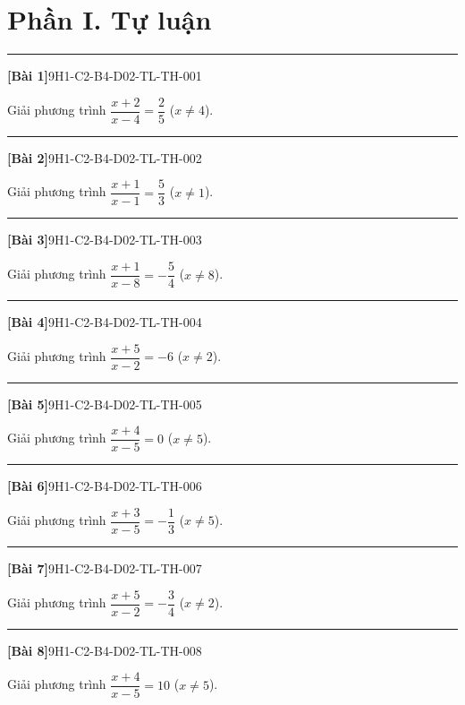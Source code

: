 \documentclass[12pt,a4paper]{article}
\newif\ifloigiai
\newenvironment{cauhoi}[2]{%
  \par\medskip\noindent\rule{\textwidth}{0.4pt}\par\nopagebreak
  \noindent\textbf{[#1]}\hfill{\scriptsize\ttfamily #2}\par\nopagebreak\smallskip}{\par}
\newcommand{\loigiai}[1]{\ifloigiai\par\smallskip\noindent\textit{Lời giải.} #1\par\fi}
\begin{document}
\section*{Phần I. Tự luận}
\begin{cauhoi}{Bài 1}{9H1-C2-B4-D02-TL-TH-001}
Giải phương trình $\dfrac{x+2}{x-4}=\dfrac{2}{5}$ ($x\ne 4$).
\loigiai{Điều kiện $x\ne 4$. Nhân hai vế với $x-4$: $x+2=\dfrac{2}{5}(x-4)$. Giải ta được $x=-6$ (thoả điều kiện).}
\end{cauhoi}
\begin{cauhoi}{Bài 2}{9H1-C2-B4-D02-TL-TH-002}
Giải phương trình $\dfrac{x+1}{x-1}=\dfrac{5}{3}$ ($x\ne 1$).
\loigiai{Điều kiện $x\ne 1$. Nhân hai vế với $x-1$: $x+1=\dfrac{5}{3}(x-1)$. Giải ta được $x=4$ (thoả điều kiện).}
\end{cauhoi}
\begin{cauhoi}{Bài 3}{9H1-C2-B4-D02-TL-TH-003}
Giải phương trình $\dfrac{x+1}{x-8}=-\dfrac{5}{4}$ ($x\ne 8$).
\loigiai{Điều kiện $x\ne 8$. Nhân hai vế với $x-8$: $x+1=-\dfrac{5}{4}(x-8)$. Giải ta được $x=4$ (thoả điều kiện).}
\end{cauhoi}
\begin{cauhoi}{Bài 4}{9H1-C2-B4-D02-TL-TH-004}
Giải phương trình $\dfrac{x+5}{x-2}=-6$ ($x\ne 2$).
\loigiai{Điều kiện $x\ne 2$. Nhân hai vế với $x-2$: $x+5=-6(x-2)$. Giải ta được $x=1$ (thoả điều kiện).}
\end{cauhoi}
\begin{cauhoi}{Bài 5}{9H1-C2-B4-D02-TL-TH-005}
Giải phương trình $\dfrac{x+4}{x-5}=0$ ($x\ne 5$).
\loigiai{Điều kiện $x\ne 5$. Nhân hai vế với $x-5$: $x+4=0(x-5)$. Giải ta được $x=-4$ (thoả điều kiện).}
\end{cauhoi}
\begin{cauhoi}{Bài 6}{9H1-C2-B4-D02-TL-TH-006}
Giải phương trình $\dfrac{x+3}{x-5}=-\dfrac{1}{3}$ ($x\ne 5$).
\loigiai{Điều kiện $x\ne 5$. Nhân hai vế với $x-5$: $x+3=-\dfrac{1}{3}(x-5)$. Giải ta được $x=-1$ (thoả điều kiện).}
\end{cauhoi}
\begin{cauhoi}{Bài 7}{9H1-C2-B4-D02-TL-TH-007}
Giải phương trình $\dfrac{x+5}{x-2}=-\dfrac{3}{4}$ ($x\ne 2$).
\loigiai{Điều kiện $x\ne 2$. Nhân hai vế với $x-2$: $x+5=-\dfrac{3}{4}(x-2)$. Giải ta được $x=-2$ (thoả điều kiện).}
\end{cauhoi}
\begin{cauhoi}{Bài 8}{9H1-C2-B4-D02-TL-TH-008}
Giải phương trình $\dfrac{x+4}{x-5}=10$ ($x\ne 5$).
\loigiai{Điều kiện $x\ne 5$. Nhân hai vế với $x-5$: $x+4=10(x-5)$. Giải ta được $x=6$ (thoả điều kiện).}
\end{cauhoi}
\end{document}
